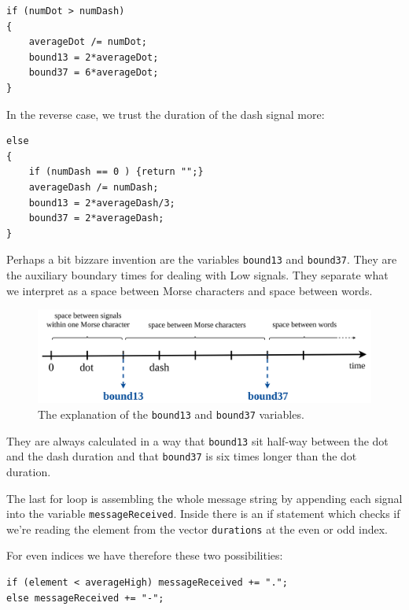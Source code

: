 \documentclass[12pt]{report}
\begin{document}
\begin{lstlisting}
if (numDot > numDash)
{
	averageDot /= numDot;
	bound13 = 2*averageDot;
	bound37 = 6*averageDot;
}
\end{lstlisting}

In the reverse case, we trust the duration of the dash signal more:

\begin{lstlisting}
else
{
	if (numDash == 0 ) {return "";}
	averageDash /= numDash;
	bound13 = 2*averageDash/3;
	bound37 = 2*averageDash;
}
\end{lstlisting}

Perhaps a bit bizzare invention are the variables \texttt{bound13} and \texttt{bound37}. They are the auxiliary boundary times for dealing with Low signals. They separate what we interpret as a space between Morse characters and space between words.


\begin{figure}[H]
\centering\includegraphics[width=14.5cm]{bound13_37.png}
\caption{The explanation of the \texttt{bound13} and \texttt{bound37} variables.}				
\label{fig:bound}
\end{figure}

They are always calculated in a way that \texttt{bound13} sit half-way between the dot and the dash duration and that \texttt{bound37} is six times longer than the dot duration.







The last for loop is assembling the whole message string by appending each signal into the variable \texttt{messageReceived}. Inside there is an if statement which checks if we're reading the element from the vector \texttt{durations} at the even or odd index.

For even indices we have therefore these two possibilities:

\begin{lstlisting}
if (element < averageHigh) messageReceived += ".";
else messageReceived += "-";
\end{lstlisting}
\end{document}
